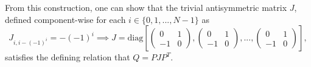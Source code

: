 From this construction, one can show that the trivial antisymmetric matrix $J$, defined component-wise for each $i\in \{0, 1, ..., N - 1\}$ as
\begin{equation}
	J_{i, i - (-1)^i} = -(-1)^i \implies J = \mathrm{diag}\left[ \begin{pmatrix} 0 & 1 \\ -1 & 0 \end{pmatrix}, \begin{pmatrix} 0 & 1 \\ -1 & 0 \end{pmatrix}, ..., \begin{pmatrix} 0 & 1 \\ -1 & 0 \end{pmatrix} \right],
\end{equation}
satisfies the defining relation that $Q = PJP^T$. 


